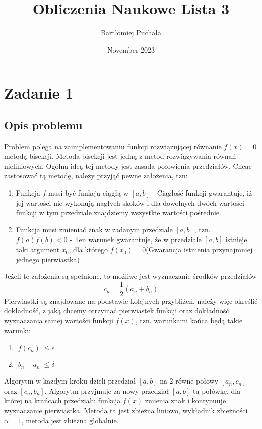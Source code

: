 \documentclass{article}
\title{Obliczenia Naukowe Lista 3}
\author{Bartłomiej Puchała}
\date{November 2023}
\begin{document}
\maketitle

\section{Zadanie 1}
\subsection{Opis problemu}
Problem polega na zaimplementowaniu funkcji rozwiązującej równanie $f(x) = 0$ metodą bisekcji. Metoda bisekcji jest jedną z metod rozwiązywania równań nieliniowych. Ogólną ideą tej metody jest zasada połowienia przedziałów. Chcąc zastosować tą metodę, należy przyjąć pewne założenia, tzn:
\begin{enumerate}
    \item Funkcja $f$ musi być funkcją ciągłą w \([a,b]\) - Ciągłość funkcji gwarantuje, iż jej wartości nie wykonują nagłych skoków i dla dowolnych dwóch wartości funkcji w tym przedziale znajdziemy wszystkie wartości pośrednie. 
    \item Funkcja musi zmieniać znak w zadanym przedziale \([a,b]\), tzn.
    $f(a)f(b) < 0$ - Ten warunek gwarantuje, że w przedziale \([a,b]\) istnieje taki argument $x_0$, dla którego $f(x_0) = 0$(Gwarancja istnienia przynajmniej jednego pierwiastka)
\end{enumerate}
Jeżeli te założenia są spełnione, to możliwe jest wyznaczanie środków przedziałów 
$$ c_n = \frac{1}{2}(a_n + b_n)$$  
Pierwiastki są znajdowane na podstawie kolejnych przybliżeń, należy więc określić dokładność, z jaką chcemy otrzymać pierwiastek funkcji oraz dokładność wyznaczania samej wartości funkcji $f(x)$, tzn. warunkami końca będą takie warunki:
\begin{enumerate}
    \item $|f(c_n)| \leq \epsilon $
    \item $|b_n - a_n| \leq \delta $
\end{enumerate}
Algorytm w każdym kroku dzieli przedział \([a,b]\) na 2 równe połowy $[a_n, c_n]$ oraz $[c_n, b_n]$. Algorytm przyjmuje za nowy przedział $[a, b]$ tą połówkę, dla której na krańcach przedziału funkcja $f(x)$ zmienia znak i kontynuuje wyznaczanie pierwiastka. Metoda ta jest zbieżna liniowo, wykładnik zbieżności $ \alpha = 1 $, metoda jest zbieżna globalnie.
\end{document}
